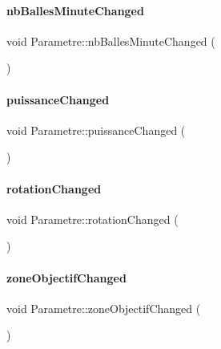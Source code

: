 \paragraph{\texorpdfstring{nb\+Balles\+Minute\+Changed}{nbBallesMinuteChanged}}
{\footnotesize\ttfamily void Parametre\+::nb\+Balles\+Minute\+Changed (\begin{DoxyParamCaption}{ }\end{DoxyParamCaption})\hspace{0.3cm}{\ttfamily [signal]}}

\mbox{\label{class_parametre_a64b3714d188ff1e30ee708c1d30bce4b}} 
\paragraph{\texorpdfstring{puissance\+Changed}{puissanceChanged}}
{\footnotesize\ttfamily void Parametre\+::puissance\+Changed (\begin{DoxyParamCaption}{ }\end{DoxyParamCaption})\hspace{0.3cm}{\ttfamily [signal]}}

\mbox{\label{class_parametre_aa597b6999dffa17784454457d88f64d7}} 
\paragraph{\texorpdfstring{rotation\+Changed}{rotationChanged}}
{\footnotesize\ttfamily void Parametre\+::rotation\+Changed (\begin{DoxyParamCaption}{ }\end{DoxyParamCaption})\hspace{0.3cm}{\ttfamily [signal]}}

\mbox{\label{class_parametre_a211162a0aa7064d469866f854248d5c0}} 
\paragraph{\texorpdfstring{zone\+Objectif\+Changed}{zoneObjectifChanged}}
{\footnotesize\ttfamily void Parametre\+::zone\+Objectif\+Changed (\begin{DoxyParamCaption}{ }\end{DoxyParamCaption})\hspace{0.3cm}{\ttfamily [signal]}}

